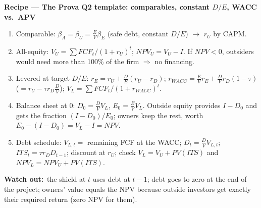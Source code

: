 \documentclass[10pt,a4paper]{article}
\newcommand{\recipe}[1]{\par\smallskip\noindent\textbf{\color{hd}Recipe --- #1}\par}
\newcommand{\watch}{\par\noindent\textbf{\color{wr}Watch out:}~}
\begin{document}
\recipe{The Prova Q2 template: comparables, constant $D/E$, WACC vs.\ APV}
\begin{enumerate}
  \item Comparable: $\beta_A=\beta_U=\frac EV\beta_E$ (safe debt, constant $D/E$) $\to$ $r_U$ by CAPM.
  \item All-equity: $V_U=\sum FCF_t/(1+r_U)^t$; $NPV_U=V_U-I$. If $NPV<0$, outsiders would need more
        than 100\% of the firm $\Rightarrow$ no financing.
  \item Levered at target $D/E$: $r_E=r_U+\frac DE(r_U-r_D)$; $r_{WACC}=\frac EVr_E+\frac DVr_D(1-\tau)$
        ($=r_U-\tau r_D\frac DV$); $V_L=\sum FCF_t/(1+r_{WACC})^t$.
  \item Balance sheet at 0: $D_0=\frac DVV_L$, $E_0=\frac EVV_L$. Outside equity provides $I-D_0$ and
        gets the fraction $(I-D_0)/E_0$; owners keep the rest, worth $E_0-(I-D_0)=V_L-I=NPV$.
  \item Debt schedule: $V_{L,t}=$ remaining FCF at the WACC; $D_t=\frac DVV_{L,t}$;
        $ITS_t=\tau r_DD_{t-1}$; discount at $r_U$; check $V_L=V_U+PV(ITS)$ and
        $NPV_L=NPV_U+PV(ITS)$.
\end{enumerate}
\watch the shield at $t$ uses debt at $t-1$; debt goes to zero at the end of the project; owners'
value equals the NPV because outside investors get exactly their required return (zero NPV for them).
\end{document}

